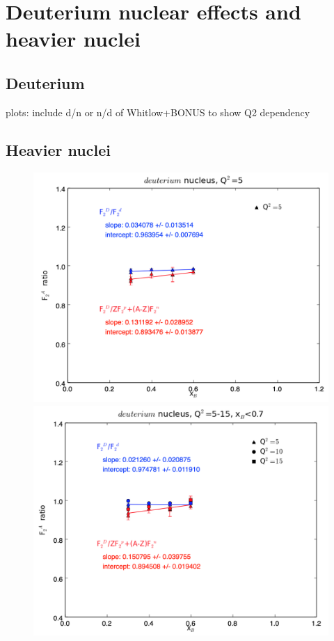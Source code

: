 \documentclass[oneside]{article}
\begin{document}
 
\section{Deuterium nuclear effects and heavier nuclei}

\subsection{Deuterium}



plots: include d/n or n/d of Whitlow+BONUS to show Q2 dependency

\subsection{Heavier nuclei}


  \begin{figure}
\begin{minipage}{0.5\textwidth}
 \includegraphics[width=\textwidth]{plots/q2_5/q2_5_D.png}
\end{minipage}\hfill\begin{minipage}{0.5\textwidth}
\includegraphics[width=\textwidth]{plots/q2_all_x_l7/q2_all_x_l7_D.png}

\end{minipage}
\end{figure}
\end{document}
